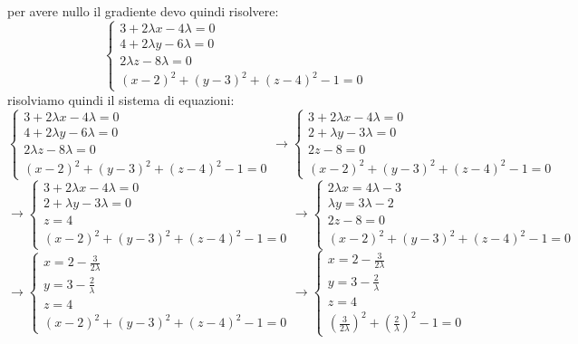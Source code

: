 \documentclass[a4paper,12pt, oneside]{book}
\begin{document}
per avere nullo il gradiente devo quindi risolvere:
\[
  \begin{cases}
    3+2\lambda x-4\lambda=0\\
    4+2\lambda y-6\lambda=0\\
    2\lambda z-8\lambda=0\\
    (x-2)^2+(y-3)^2+(z-4)^2-1=0
  \end{cases}
\]
risolviamo quindi il sistema di equazioni:
\[
  \begin{cases}
    3+2\lambda x-4\lambda=0\\
    4+2\lambda y-6\lambda=0\\
    2\lambda z-8\lambda=0\\
    (x-2)^2+(y-3)^2+(z-4)^2-1=0
  \end{cases}\to
  \begin{cases}
    3+2\lambda x-4\lambda=0\\
    2+\lambda y-3\lambda=0\\
    2z-8=0\\
    (x-2)^2+(y-3)^2+(z-4)^2-1=0
  \end{cases}
\]
\[
  \to\begin{cases}
    3+2\lambda x-4\lambda=0\\
    2+\lambda y-3\lambda=0\\
    z=4\\
    (x-2)^2+(y-3)^2+(z-4)^2-1=0
  \end{cases}\to
  \begin{cases}
    2\lambda x=4\lambda-3\\
    \lambda y=3\lambda-2\\
    2z-8=0\\
    (x-2)^2+(y-3)^2+(z-4)^2-1=0
  \end{cases}
\]
\[
  \to\begin{cases}
    x=2-\frac{3}{2\lambda}\\
    y=3-\frac{2}{\lambda}\\
    z=4\\
    (x-2)^2+(y-3)^2+(z-4)^2-1=0
  \end{cases}
  \to\begin{cases}
    x=2-\frac{3}{2\lambda}\\
    y=3-\frac{2}{\lambda}\\
    z=4\\
    (\frac{3}{2\lambda})^2+(\frac{2}{\lambda})^2-1=0
  \end{cases}
\]
\end{document}
